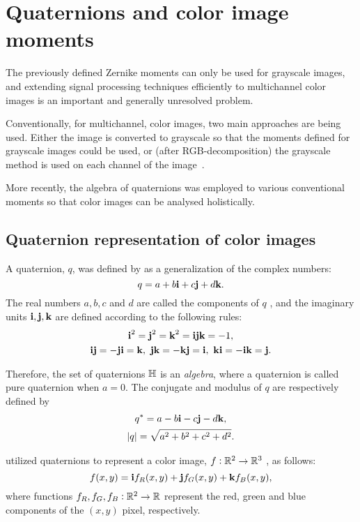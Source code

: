 \section{Quaternions and color image moments}
The previously defined Zernike moments can only be used for grayscale images, and extending signal processing techniques efficiently to multichannel color images is an important and generally unresolved problem.

Conventionally, for multichannel, color images, two main approaches are being used. Either the image is converted to grayscale so that the moments defined for grayscale images could be used, or (after RGB-decomposition) the grayscale method is used on each channel of the image~\cite{affine_color}.

More recently, the algebra of quaternions was employed to various conventional moments so that color images can be analysed holistically.

\subsection{Quaternion representation of color images}

A quaternion, $q$, was defined by \citeauthor{Hamilton} \cite{Hamilton} as a generalization of the complex numbers: 
\[
	q = a+b\textbf{i} +c\textbf{j}+d\textbf{k}.
\]
The real numbers $a , b , c$ and $d$ are called the components of $q$ , and the imaginary units $\textbf{i} , \textbf{j}, \textbf{k}$ are defined according to the following rules:
\[
\begin{gathered}
	\textbf{i}^2 = \textbf{j}^2 = \textbf{k}^2 = \textbf{i}\textbf{j}\textbf{k} = -1,\\
	\textbf{i}\textbf{j} = -\textbf{j}\textbf{i} = \textbf{k},\ \textbf{j}\textbf{k} = -\textbf{k}\textbf{j} = \textbf{i},\ \textbf{k}\textbf{i} = -\textbf{i}\textbf{k} = \textbf{j}.
\end{gathered}
\]

Therefore, the set of quaternions $\mathbb{H}$ is an \textit{algebra}, where a quaternion is called pure quaternion when $a=0$. 
The conjugate and modulus of $q$ are respectively defined by 
\[
\begin{gathered}
q^* = a-b\textbf{i}-c\textbf{j}-d\textbf{k}, \\
|q| = \sqrt{a^2+b^2+c^2+d^2}.
\end{gathered}
\]

\citeauthor{EllSangwine} \cite{EllSangwine} utilized quaternions to represent a color image, $f: \mathbb{R}^2\to\mathbb{R}^3$ , as follows:
\[
f(x,y) = \textbf{i} f_R(x,y) + \textbf{j} f_G(x,y) + \textbf{k} f_B(x,y),
\]
where functions $f_R , f_G, f_B:\mathbb{R}^2\to\mathbb{R}$ represent the red, green and blue components of the $(x,y)$ pixel, respectively.

